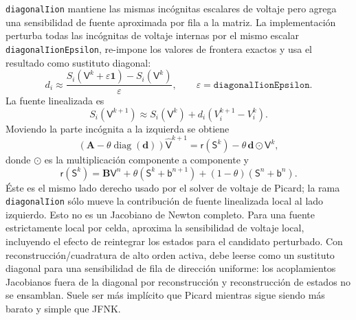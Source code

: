 \documentclass[11pt,a4paper]{article}
\newcommand{\code}[1]{\texttt{\small #1}}
\newcommand{\Aimp}{\mathbf{A}}
\newcommand{\Bimp}{\mathbf{B}}
\begin{document}
\code{diagonalIion} mantiene las mismas incógnitas escalares de voltaje pero agrega una
sensibilidad de fuente aproximada por fila a la matriz. La implementación perturba todas las
incógnitas de voltaje internas por el mismo escalar \code{diagonalIionEpsilon}, re-impone los
valores de frontera exactos y usa el resultado como sustituto diagonal:
\begin{equation}
  d_i
  \approx
  \frac{S_i(\mathsf{V}^k+\varepsilon\mathbf{1})-S_i(\mathsf{V}^k)}
       {\varepsilon},
  \qquad
  \varepsilon=\texttt{diagonalIionEpsilon}.
  \label{eq:diagonal-derivative}
\end{equation}
La fuente linealizada es
\begin{equation}
  S_i(\mathsf{V}^{k+1})
  \approx
  S_i(\mathsf{V}^{k})
  + d_i\left(V^{k+1}_i-V^k_i\right).
\end{equation}
Moviendo la parte incógnita a la izquierda se obtiene
\begin{equation}
  \left(\Aimp-\theta\operatorname{diag}(\mathbf{d})\right)
  \widehat{\mathsf{V}}^{k+1}
  =
  \mathsf{r}(\mathsf{S}^k)
  -
  \theta\,\mathbf{d}\odot\mathsf{V}^{k},
  \label{eq:diagonal-system}
\end{equation}
donde $\odot$ es la multiplicación componente a componente y
\begin{equation}
  \mathsf{r}(\mathsf{S}^{k})
  =
  \Bimp\mathsf{V}^{n}
  +\theta\left(\mathsf{S}^{k}+\mathsf{b}^{n+1}\right)
  +(1-\theta)\left(\mathsf{S}^{n}+\mathsf{b}^{n}\right).
\end{equation}
Éste es el mismo lado derecho usado por el solver de voltaje de Picard; la rama
\code{diagonalIion} sólo mueve la contribución de fuente linealizada local al lado izquierdo.
Esto no es un Jacobiano de Newton completo. Para una fuente estrictamente local por celda,
aproxima la sensibilidad de voltaje local, incluyendo el efecto de reintegrar los estados
para el candidato perturbado. Con reconstrucción/cuadratura de alto orden activa, debe
leerse como un sustituto diagonal para una sensibilidad de fila de dirección uniforme: los
acoplamientos Jacobianos fuera de la diagonal por reconstrucción y reconstrucción de estados
no se ensamblan. Suele ser más implícito que Picard mientras sigue siendo más barato y
simple que JFNK.
\end{document}

